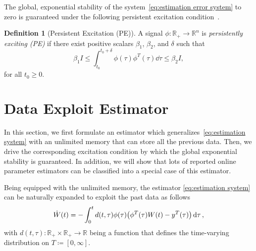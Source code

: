 \documentclass[]{IEEEtran}
\theoremstyle{definition}
\newtheorem{definition}{Definition}
\theoremstyle{remark}
\newcommand{\MB}[1]{\mathbb{#1}}
\begin{document}
The global, exponential stability of the
system~\eqref{eq:estimation error system} to zero is guaranteed under the
following persistent excitation condition~\cite{anderson_exponential_1977,
slotine_applied_1991}.

\begin{definition}[Persistent Excitation (PE)]
	A signal $\phi: \MB{R}_{+} \to \MB{R}^n$ is \textit{persistently exciting
	(PE)} if there exist positive scalars $\beta_1$, $\beta_2$, and $\delta$ such
	that
	\begin{equation}\label{eq:PE}
		\beta_1 I \le \int_{t_0}^{t_0+\delta} \phi(\tau) \phi^T(\tau) \dd{\tau} \le
		\beta_2 I,
	\end{equation}
	for all $t_0 \ge 0$.
\end{definition}




\section{Data Exploit Estimator}

In this section, we first formulate an estimator which
generalizes~\eqref{eq:estimation system} with an unlimited memory that can
store all the previous data.  Then, we drive the corresponding excitation
condition by which the global exponential stability is guaranteed.  In
addition, we will show that lots of reported online parameter estimators can be
classified into a special case of this estimator.

Being equipped with the unlimited memory, the estimator \eqref{eq:estimation
system} can be naturally expanded to exploit the past data as follows
\begin{equation}\label{eq:estimation system memory}
	\dot{W}(t) = - \int_0^t d(t, \tau) \phi(\tau) \qty(\phi^T(\tau) W(t) -
	y^T(\tau)) \dd{\tau},
\end{equation}
with $d(t, \tau): \MB{R}_{+} \times \MB{R}_{+} \to \MB{R}$ being a function
that defines the time-varying distribution on $T \coloneqq [0, \infty]$.
\end{document}
